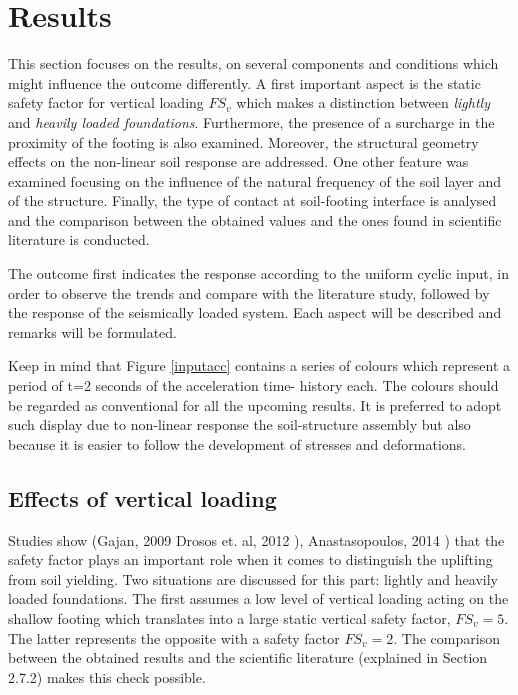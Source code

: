 \newpage
\section{Results}
This section focuses on the results, on several components and conditions which might influence the outcome differently. A first important aspect is the static safety factor for vertical loading $FS_v$ which makes a distinction between \textit{lightly} and \textit{heavily loaded foundations}. Furthermore, the presence of a surcharge in the proximity of the footing is also examined. Moreover, the structural geometry effects on the non-linear soil response are addressed. One other feature was examined focusing on the influence of the natural frequency of the soil layer and of the structure. Finally, the type of contact at soil-footing interface is analysed and the comparison between the obtained values and the ones found in scientific literature is conducted.

The outcome first indicates the response according to the uniform cyclic input, in order to observe the trends and compare with the literature study, followed by the response of the seismically loaded system. Each aspect will be described and remarks will be formulated.

Keep in mind that Figure \ref{inputacc} contains a series of colours which represent a period of t=2 seconds of the acceleration time- history each. The colours should be regarded as conventional for all the upcoming results. It is preferred to adopt such display due to non-linear response the soil-structure assembly but also because it is easier to follow the development of stresses and deformations.

\subsection{Effects of vertical loading}
Studies show (Gajan, 2009 \cite{gajan2009effects} Drosos et. al, 2012 \cite{drosos2012soil}), Anastasopoulos, 2014 \cite{anastasopoulos2014simplified}) that the safety factor plays an important role when it comes to distinguish the uplifting from soil yielding. Two situations are discussed for this part: lightly and heavily loaded foundations. The first assumes a low level of vertical loading acting on the shallow footing which translates into a large static vertical safety factor, $FS_v=5$. The latter represents the opposite with a safety factor $FS_v=2.$ The comparison between the obtained results and the scientific literature (explained in Section 2.7.2) makes this check possible.

